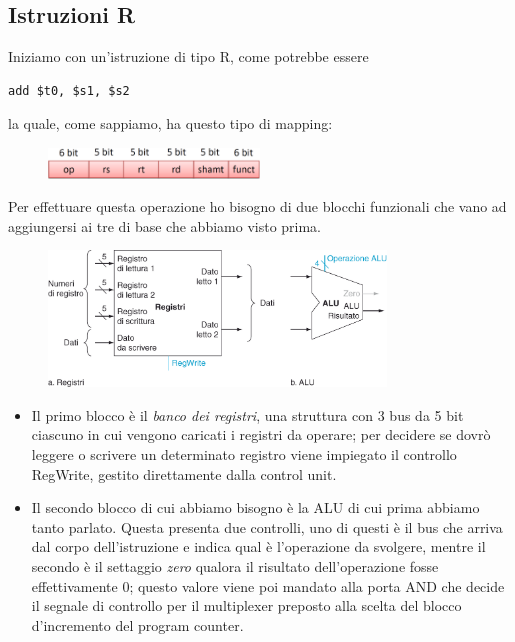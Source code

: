 \documentclass[class=book, crop=false, oneside]{standalone}
\begin{document}
\subsection{Istruzioni R}
Iniziamo con un’istruzione di tipo R, come potrebbe essere
\begin{verbatim}
add $t0, $s1, $s2
\end{verbatim}
la quale, come sappiamo, ha questo tipo di mapping:
\begin{figure}[H]
	\centering
	\includegraphics[width=0.5\textwidth,keepaspectratio]{mappatura.png}
\end{figure}
Per effettuare questa operazione ho bisogno di due blocchi funzionali che vano ad aggiungersi ai tre di base che abbiamo visto prima.
\begin{figure}[H]
	\centering
	\includegraphics[width=0.8\textwidth,keepaspectratio]{R_ex.png}
\end{figure}
\begin{itemize}
	\item Il primo blocco è il \emph{banco dei registri}, una struttura con 3 bus da 5 bit ciascuno in cui vengono caricati i registri da operare; per decidere se dovrò leggere o scrivere un determinato registro viene impiegato il controllo RegWrite, gestito direttamente dalla control unit.
	\item Il secondo blocco di cui abbiamo bisogno è la ALU di cui prima abbiamo tanto parlato. Questa presenta due controlli, uno di questi è il bus che arriva dal corpo dell'istruzione e indica qual è l'operazione da svolgere, mentre il secondo è il settaggio \emph{zero} qualora il risultato dell'operazione fosse effettivamente 0; questo valore viene poi mandato alla porta AND che decide il segnale di controllo per il multiplexer preposto alla scelta del blocco d'incremento del program counter.
\end{itemize}
\end{document}
